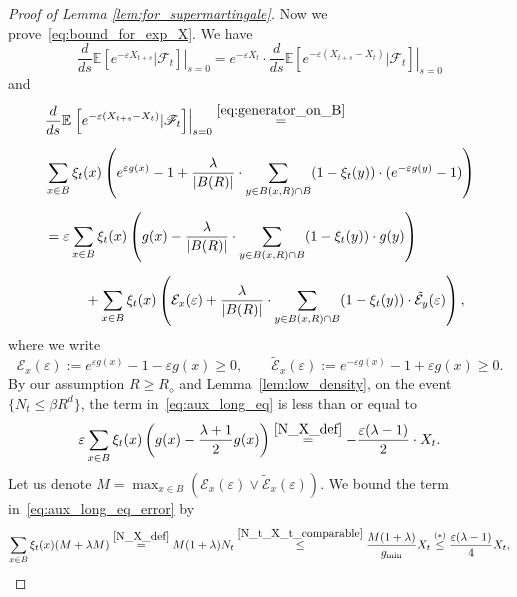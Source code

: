 \documentclass[a4paper,12pt]{article}
\begin{document}
\begin{proof}[Proof of Lemma \ref{lem:for_supermartingale}]
Now we prove~\eqref{eq:bound_for_exp_X}. We have
\begin{equation} \label{eq:take_out_exp} \frac{d}{ds}\mathbb{E}\left.\left[e^{-\varepsilon X_{t+s}} | \mathscr{F}_t\right] \right|_{s= 0} = e^{-\varepsilon X_t} \cdot \frac{d}{ds} \mathbb{E}\left.\left[ e^{-\varepsilon (X_{t+s} - X_t)} | \mathscr{F}_t\right]\right|_{s = 0}\end{equation}
and
\begin{align}
\nonumber & \frac{d}{ds} \mathbb{E}\left.\left[ e^{-\varepsilon (X_{t+s} - X_t)} | \mathscr{F}_t\right]\right|_{s = 0} \stackrel{ \eqref{eq:generator_on_B} }{=} \\[.2cm]
\nonumber&     \sum_{\substack{x \in B}}  \xi_t(x) \left(  e^{\varepsilon g(x)} - 1  +  \frac{\lambda}{|B(R)|}\cdot\sum_{\substack{y \in B(x,R) \cap B}} (1-\xi_t(y))\cdot (e^{-\varepsilon g(y)} - 1) \right)  \\[.2cm]
\label{eq:aux_long_eq}&=   \varepsilon      \sum_{\substack{x \in B}}  \xi_t(x) \left(   g(x) -  \frac{\lambda}{|B(R)|}\cdot\sum_{\substack{y \in B(x,R) \cap B}} (1-\xi_t(y))\cdot  g(y) \right) \\[.2cm]
\label{eq:aux_long_eq_error}&\hspace{1cm} +   \sum_{\substack{x \in B}}  \xi_t(x) \left(  \mathcal{E}_x(\varepsilon) +  \frac{\lambda}{|B(R)|}\cdot\sum_{\substack{y \in B(x,R) \cap B}} (1-\xi_t(y))\cdot \tilde{\mathcal{E}}_y(\varepsilon) \right),
\end{align}
where we write
\begin{equation}\label{error_terms_def_g_eps}
 \mathcal{E}_x(\varepsilon) :=  e^{\varepsilon g(x)} - 1 -  \varepsilon g(x)\geq 0,\qquad \tilde{\mathcal{E}}_x(\varepsilon) := e^{-\varepsilon g(x)} - 1 + \varepsilon g(x)\geq 0.
\end{equation}
By our assumption $R \geq R_\diamond$ and Lemma~\ref{lem:low_density}, on the event~$\{N_t \leq \beta R^d \}$, the term in~\eqref{eq:aux_long_eq} is less than or equal to
\begin{equation}\label{linear_term_bound_g_eps}
\varepsilon    \sum_{x \in B} \xi_t(x) \left(g(x)- \frac{\lambda + 1}{2} g(x) \right) \stackrel{ \eqref{N_X_def} }{=} - \frac{\varepsilon(\lambda - 1)}{2} \cdot X_t.
\end{equation}
Let us denote $M=\max_{x \in B} \left(\mathcal{E}_x(\varepsilon) \vee \tilde{\mathcal{E}}_x(\varepsilon)\right)$. We bound the term in~\eqref{eq:aux_long_eq_error}
by
\begin{equation}\label{error_term_bound_g_eps}
\sum_{x \in B} \xi_t(x) ( M +\lambda M) \stackrel{ \eqref{N_X_def} }{=} M  (1+\lambda) N_t \stackrel{ \eqref{N_t_X_t_comparable} }{\leq} \frac{M  (1+\lambda)}{ g_{\min} } X_t \stackrel{(*)}{\leq } \frac{\varepsilon(\lambda - 1)}{4}  X_t,

\end{equation}
\end{proof}
\end{document}
